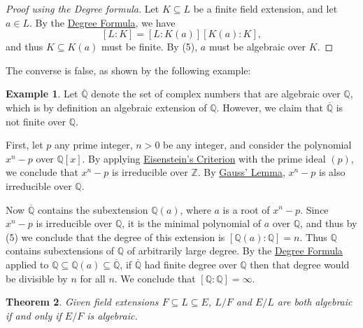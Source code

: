 \documentclass[12pt]{report}
\newtheorem{theorem}{Theorem}[chapter]
\numberwithin{equation}{section}
\numberwithin{theorem}{chapter}
\theoremstyle{definition}
\newtheorem{example}[theorem]{Example}
\newtheorem*{basic properties}{Basic Properties}
\newtheorem*{Important Remark}{Important Remark}
\begin{document}
\begin{proof}[Proof using the Degree formula]
	Let $K \subseteq L$ be a finite field extension, and let $a \in L$. By the \hyperref[deg formula]{Degree Formula}, we have 
	$$[L : K] = [L : K(a)][K(a): K],$$
	and thus $K \subseteq K(a)$ must be finite. By  (5), $a$ must be algebraic over $K$.
\end{proof}


The converse is false, as shown by the following example:

\begin{example}\label{example closure of Q}
Let $\overline{\mathbb{Q}}$ denote the set of complex numbers that are algebraic over $\mathbb{Q}$, which is by definition an algebraic extension of $\mathbb{Q}$. However, we claim that $\overline{\mathbb{Q}}$ is not finite over $\mathbb{Q}$. 

First, let $p$ any prime integer, $n>0$ be any integer, and consider the polynomial $x^n-p$ over $\mathbb{Q}[x]$. By applying \hyperref[eisenstein criterion]{Eisenstein's Criterion} with the prime ideal $(p)$, we conclude that $x^n-p$ is irreducible over $\mathbb{Z}$. By \hyperref[Gauss Lemma]{Gauss' Lemma}, $x^n-p$ is also irreducible over $\mathbb{Q}$. 

Now $\overline{\mathbb{Q}}$ contains the subextension $\mathbb{Q}(a)$, where $a$ is a root of $x^n-p$. Since $x^n-p$ is irreducible over $\mathbb{Q}$, it is the minimal polynomial of $a$ over $\mathbb{Q}$, and thus by  (5) we conclude that the degree of this extension is $[\mathbb{Q}(a):\mathbb{Q}]=n$. Thus $\mathbb{Q}$ contains subextensions of $\mathbb{Q}$ of arbitrarily large degree. By the \hyperref[deg formula]{Degree Formula} applied to $\mathbb{Q} \subseteq \mathbb{Q}(a) \subseteq \overline{\mathbb{Q}}$, if $\overline{\mathbb{Q}}$ had finite degree over $\mathbb{Q}$ then that degree would be divisible by $n$ for all $n$. We conclude that $[\mathbb{Q} : \mathbb{Q}] = \infty$.
\end{example}


\begin{theorem}\label{algebraictower}
Given field extensions $F \subseteq L \subseteq E$, $L/F$ and $E/L$ are both algebraic if and only if $E/F$ is algebraic.
\end{theorem}
\end{document}
